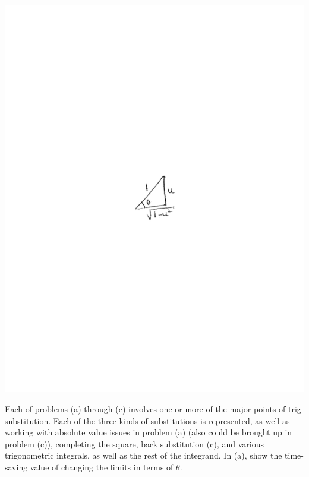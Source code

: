 \documentclass[handout,instructornotes]{ximera}
\begin{document}
\begin{problem}
\begin{enumerate}
\begin{freeResponse}
		\begin{image}
		\includegraphics[trim= 270 350 250 360]{Figure7-4-4.pdf}
		\end{image}
		
	\end{freeResponse}

	\end{enumerate}

\end{problem}

\begin{instructorNotes}
Each of problems (a) through (c) involves one or more of the major points of trig substitution.  
Each of the three kinds of substitutions is represented, as well as working with absolute value issues in problem (a) (also could be brought up in problem (c)), completing the square, back substitution (c), and various trigonometric integrals.  
 as well as the rest of the integrand.  
In  (a), show the time-saving value of changing the limits in terms of $\theta$.  
\end{instructorNotes}
\end{document}
